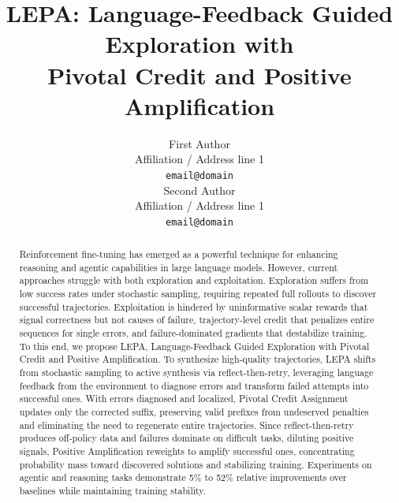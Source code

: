 \documentclass[11pt]{article}
\title{LEPA: Language-Feedback Guided Exploration with \\
Pivotal Credit and Positive Amplification}
\author{First Author \\
  Affiliation / Address line 1 \\
  \texttt{email@domain} \\\And
  Second Author \\
  Affiliation / Address line 1 \\
  \texttt{email@domain} \\}
\begin{document}
\maketitle
\begin{abstract}
Reinforcement fine-tuning has emerged as a powerful technique for enhancing reasoning and agentic capabilities in large language models. However, current approaches struggle with both exploration and exploitation. Exploration suffers from low success rates under stochastic sampling, requiring repeated full rollouts to discover successful trajectories. Exploitation is hindered by uninformative scalar rewards that signal correctness but not causes of failure, trajectory-level credit that penalizes entire sequences for single errors, and failure-dominated gradients that destabilize training. To this end, we propose LEPA, Language-Feedback Guided Exploration with Pivotal Credit and Positive Amplification. To synthesize high-quality trajectories, LEPA shifts from stochastic sampling to active synthesis via reflect-then-retry, leveraging language feedback from the environment to diagnose errors and transform failed attempts into successful ones. With errors diagnosed and localized, Pivotal Credit Assignment updates only the corrected suffix, preserving valid prefixes from undeserved penalties and eliminating the need to regenerate entire trajectories. Since reflect-then-retry produces off-policy data and failures dominate on difficult tasks, diluting positive signals, Positive Amplification reweights to amplify successful ones, concentrating probability mass toward discovered solutions and stabilizing training. Experiments on agentic and reasoning tasks demonstrate 5\% to 52\% relative improvements over baselines while maintaining training stability.
\end{abstract}
\end{document}
